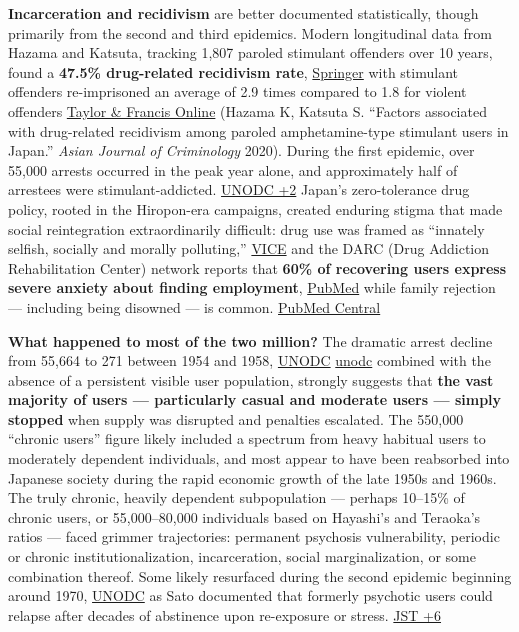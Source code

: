 \textbf{Incarceration and recidivism} are better documented statistically, though primarily from the second and third epidemics. Modern longitudinal data from Hazama and Katsuta, tracking 1,807 paroled stimulant offenders over 10 years, found a \textbf{47.5\% drug-related recidivism rate}, \href{https://link.springer.com/article/10.1007/s11417-019-09299-8}{Springer} with stimulant offenders re-imprisoned an average of 2.9 times compared to 1.8 for violent offenders \href{https://www.tandfonline.com/doi/full/10.1080/23311886.2018.1489458}{Taylor \& Francis Online} (Hazama K, Katsuta S. ``Factors associated with drug-related recidivism among paroled amphetamine-type stimulant users in Japan.'' \emph{Asian Journal of Criminology} 2020). During the first epidemic, over 55,000 arrests occurred in the peak year alone, and approximately half of arrestees were stimulant-addicted. \href{https://www.unodc.org/unodc/en/data-and-analysis/bulletin/bulletin_1989-01-01_1_page007.html}{UNODC +2} Japan's zero-tolerance drug policy, rooted in the Hiropon-era campaigns, created enduring stigma that made social reintegration extraordinarily difficult: drug use was framed as ``innately selfish, socially and morally polluting,'' \href{https://www.vice.com/en/article/how-stigma-created-japans-hidden-drug-problem/}{VICE} and the DARC (Drug Addiction Rehabilitation Center) network reports that \textbf{60\% of recovering users express severe anxiety about finding employment}, \href{https://pubmed.ncbi.nlm.nih.gov/24946393/}{PubMed} while family rejection --- including being disowned --- is common. \href{https://pmc.ncbi.nlm.nih.gov/articles/PMC11527305/}{PubMed Central}

\textbf{What happened to most of the two million?} The dramatic arrest decline from 55,664 to 271 between 1954 and 1958, \href{https://www.unodc.org/unodc/en/data-and-analysis/bulletin/bulletin_1989-01-01_1_page007.html}{UNODC} \href{https://www.unodc.org/unodc/en/data-and-analysis/bulletin/bulletin_1989-01-01_1_page007.html}{unodc} combined with the absence of a persistent visible user population, strongly suggests that \textbf{the vast majority of users --- particularly casual and moderate users --- simply stopped} when supply was disrupted and penalties escalated. The 550,000 ``chronic users'' figure likely included a spectrum from heavy habitual users to moderately dependent individuals, and most appear to have been reabsorbed into Japanese society during the rapid economic growth of the late 1950s and 1960s. The truly chronic, heavily dependent subpopulation --- perhaps 10--15\% of chronic users, or 55,000--80,000 individuals based on Hayashi's and Teraoka's ratios --- faced grimmer trajectories: permanent psychosis vulnerability, periodic or chronic institutionalization, incarceration, social marginalization, or some combination thereof. Some likely resurfaced during the second epidemic beginning around 1970, \href{https://www.unodc.org/unodc/en/data-and-analysis/bulletin/bulletin_1989-01-01_1_page007.html}{UNODC} as Sato documented that formerly psychotic users could relapse after decades of abstinence upon re-exposure or stress. \href{https://www.jstage.jst.go.jp/article/pjmj/55/3/55_347/_article/-char/ja/}{JST +6}

